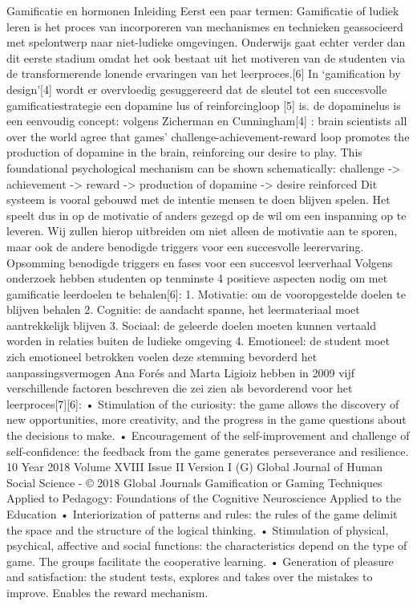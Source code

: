 \documentclass{hogent-article}
\begin{document}
Gamificatie en hormonen
Inleiding
Eerst een paar termen:
Gamificatie of ludiek leren is het proces van incorporeren van mechanismes en technieken geassocieerd met spelontwerp naar niet-ludieke omgevingen. Onderwijs gaat echter verder dan dit eerste stadium omdat het ook bestaat uit het motiveren van de studenten via de transformerende lonende ervaringen van het leerproces.[6]
In ‘gamification by design’[4] wordt er overvloedig gesuggereerd dat de sleutel tot een succesvolle gamificatiestrategie een dopamine lus of reinforcingloop [5] is. de dopaminelus is een eenvoudig concept: volgens Zicherman en Cunningham[4] :
brain scientists all over the world agree that games’ challenge-achievement-reward loop promotes the production of dopamine in the brain, reinforcing our desire to play. This foundational psychological mechanism can be shown schematically: 
challenge -> achievement -> reward -> production of dopamine -> desire reinforced
Dit systeem is vooral gebouwd met de intentie mensen te doen blijven spelen. Het speelt dus in op de motivatie of anders gezegd op de wil om een inspanning op te leveren. Wij zullen hierop uitbreiden om niet alleen de motivatie aan te sporen, maar ook de andere benodigde triggers voor een succesvolle leerervaring.
Opsomming benodigde triggers en fases voor een succesvol leerverhaal
Volgens onderzoek hebben studenten op tenminste 4 positieve aspecten nodig om met gamificatie leerdoelen te behalen[6]:
1.	Motivatie: om de vooropgestelde doelen te blijven behalen
2.	Cognitie: de aandacht spanne, het leermateriaal moet aantrekkelijk blijven 
3.	Sociaal: de geleerde doelen moeten kunnen vertaald worden in relaties buiten de ludieke omgeving
4.	Emotioneel: de student moet zich emotioneel betrokken voelen deze stemming bevorderd  het aanpassingsvermogen
Ana Forés and Marta Ligioiz hebben in 2009 vijf verschillende factoren beschreven die zei zien als bevorderend voor het leerproces[7][6]:
•	Stimulation of the curiosity: the game allows the discovery of new opportunities, more creativity, and the progress in the game questions about the decisions to make. 
•	Encouragement of the self-improvement and challenge of self-confidence: the feedback from the game generates perseverance and resilience. 10 Year 2018 Volume XVIII Issue II Version I (G) Global Journal of Human Social Science - © 2018 Global Journals Gamification or Gaming Techniques Applied to Pedagogy: Foundations of the Cognitive Neuroscience Applied to the Education 
•	Interiorization of patterns and rules: the rules of the game delimit the space and the structure of the logical thinking. 
•	Stimulation of physical, psychical, affective and social functions: the characteristics depend on the type of game. The groups facilitate the cooperative learning. 
•	Generation of pleasure and satisfaction: the student tests, explores and takes over the mistakes to improve. Enables the reward mechanism.
\end{document}
